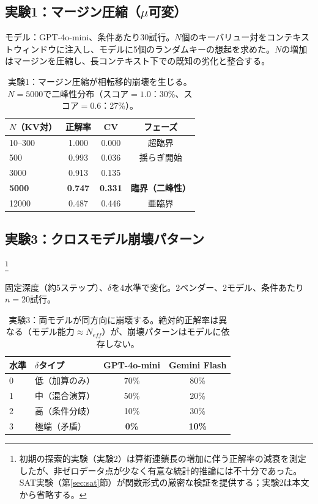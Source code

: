 \documentclass[11pt,a4paper]{article}
\begin{document}
\subsection{実験1：マージン圧縮（\texorpdfstring{$\mu$}{μ}可変）}

モデル：GPT-4o-mini、条件あたり30試行。$N$個のキーバリュー対をコンテキストウィンドウに注入し、モデルに5個のランダムキーの想起を求めた。$N$の増加はマージンを圧縮し、長コンテキスト下での既知の劣化\cite{liu2024}と整合する。

\begin{table}[htbp]
\centering
\begin{tabular}{lccc}
\toprule
\textbf{$N$（KV対）} & \textbf{正解率} & \textbf{CV} & \textbf{フェーズ} \\
\midrule
10--300 & 1.000 & 0.000 & 超臨界 \\
500 & 0.993 & 0.036 & 揺らぎ開始 \\
3000 & 0.913 & 0.135 & \\
\textbf{5000} & \textbf{0.747} & \textbf{0.331} & \textbf{臨界（二峰性）} \\
12000 & 0.487 & 0.446 & 亜臨界 \\
\bottomrule
\end{tabular}
\caption{実験1：マージン圧縮が相転移的崩壊を生じる。$N = 5000$で二峰性分布（スコア$= 1.0$：30\%、スコア$= 0.6$：27\%）。}
\label{tab:exp1}
\end{table}

\subsection{実験3：クロスモデル崩壊パターン}\footnote{初期の探索的実験（実験2）は算術連鎖長の増加に伴う正解率の減衰を測定したが、非ゼロデータ点が少なく有意な統計的推論には不十分であった。SAT実験（第\ref{sec:sat}節）が関数形式の厳密な検証を提供する；実験2は本文から省略する。}

固定深度（約5ステップ）、$\delta$を4水準で変化。2ベンダー、2モデル、条件あたり$n = 20$試行。

\begin{table}[htbp]
\centering
\begin{tabular}{llcc}
\toprule
\textbf{水準} & \textbf{$\delta$タイプ} & \textbf{GPT-4o-mini} & \textbf{Gemini Flash} \\
\midrule
0 & 低（加算のみ） & 70\% & 80\% \\
1 & 中（混合演算） & 50\% & 20\% \\
2 & 高（条件分岐） & 10\% & 30\% \\
3 & 極端（矛盾） & \textbf{0\%} & \textbf{10\%} \\
\bottomrule
\end{tabular}
\caption{実験3：両モデルが同方向に崩壊する。絶対的正解率は異なる（モデル能力$\approx N_{eff}$）が、崩壊パターンはモデルに依存しない。}
\label{tab:exp3}
\end{table}
\end{document}
